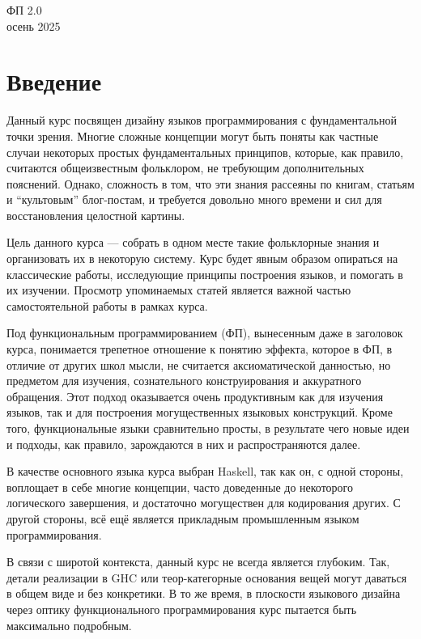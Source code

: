 \documentclass[12pt]{article}
\begin{document}
    \begin{center}
    {\LARGE ФП 2.0}
        \\
        осень 2025
    \end{center}

    \tableofcontents

    \newpage

    \section*{Введение}

    Данный курс посвящен дизайну языков программирования с фундаментальной точки зрения.
    Многие сложные концепции могут быть поняты как частные случаи некоторых простых фундаментальных принципов, которые, как правило, считаются общеизвестным фольклором, не требующим дополнительных пояснений.
    Однако, сложность в том, что эти знания рассеяны по книгам, статьям и ``культовым'' блог-постам, и требуется довольно много времени и сил для восстановления целостной картины.

    Цель данного курса --- собрать в одном месте такие фольклорные знания и организовать их в некоторую систему.
    Курс будет явным образом опираться на классические работы, исследующие принципы построения языков, и помогать в их изучении.
    Просмотр упоминаемых статей является важной частью самостоятельной работы в рамках курса.

    Под функциональным программированием (ФП), вынесенным даже в заголовок курса, понимается трепетное отношение к понятию эффекта, которое в ФП, в отличие от других школ мысли, не считается аксиоматической данностью, но предметом для изучения, сознательного конструирования и аккуратного обращения.
    Этот подход оказывается очень продуктивным как для изучения языков, так и для построения могущественных языковых конструкций.
    Кроме того, функциональные языки сравнительно просты, в результате чего новые идеи и подходы, как правило, зарождаются в них и распространяются далее.

    В качестве основного языка курса выбран Haskell, так как он, с одной стороны, воплощает в себе многие концепции, часто доведенные до некоторого логического завершения, и достаточно могуществен для кодирования других.
    С другой стороны, всё ещё является прикладным промышленным языком программирования.

    В связи с широтой контекста, данный курс не всегда является глубоким.
    Так, детали реализации в GHC или теор-категорные основания вещей могут даваться в общем виде и без конкретики.
    В то же время, в плоскости языкового дизайна через оптику функционального программирования курс пытается быть максимально подробным.
\end{document}
